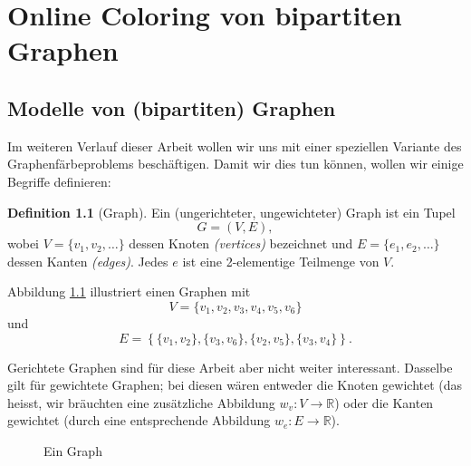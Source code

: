 \documentclass[11pt,abstracton]{scrreprt} %
\theoremstyle{definition}
\newtheorem{definition}{Definition}
\begin{document}
\chapter{Online Coloring von bipartiten Graphen}

\section{Modelle von (bipartiten) Graphen}

Im weiteren Verlauf dieser Arbeit wollen wir uns mit einer speziellen Variante des Graphenfärbeproblems beschäftigen. Damit wir dies tun können, wollen wir einige Begriffe definieren:

\begin{definition}[Graph]

Ein (ungerichteter, ungewichteter) Graph ist ein Tupel
\[
	G = (V, E),
\]
wobei $V = \{v_1, v_2, \dots \}$ dessen Knoten {\sl (vertices)} bezeichnet und $E = \{ e_1, e_2, \dots \}$ dessen Kanten {\sl (edges)}. Jedes $e$ ist eine 2-elementige Teilmenge von $V$. \cite{biggs}

\end{definition}

Abbildung \ref{graph} illustriert einen Graphen mit
\[
	V = \{v_1,v_2,v_3,v_4,v_5,v_6\}
\]
und
\[
	E = \left\{  \{v_1,v_2\}, \{v_3,v_6\}, \{v_2,v_5\}, \{v_3,v_4\}  \right\}.
\]

\bigskip
Gerichtete Graphen sind für diese Arbeit aber nicht weiter interessant. Dasselbe gilt für gewichtete Graphen; bei diesen wären entweder die Knoten gewichtet (das heisst, wir bräuchten eine zusätzliche Abbildung $w_v : V \rightarrow \mathbb{R}$) oder die Kanten gewichtet (durch eine entsprechende Abbildung $w_e : E \rightarrow \mathbb{R}$).

\begin{figure}
\caption{Ein Graph}
\label{graph}
\begin{center}


\end{center}
\end{figure}
\end{document}
